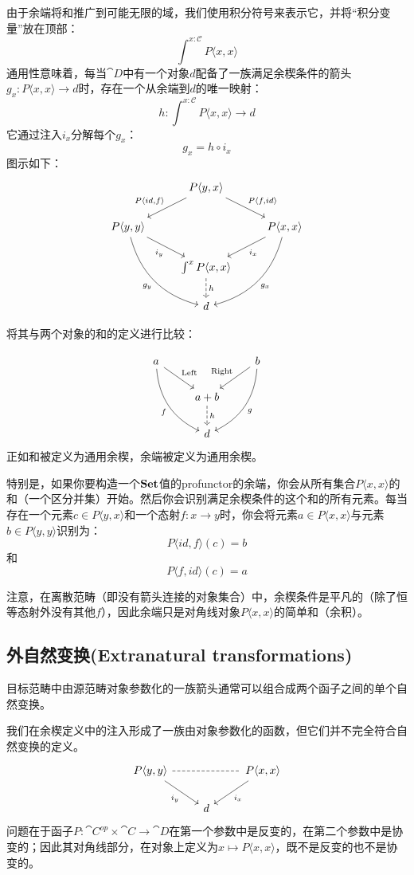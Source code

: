 \documentclass[DaoFP]{subfiles}
\begin{document}
由于余端将和推广到可能无限的域，我们使用积分符号来表示它，并将“积分变量”放在顶部：
\[ \int^{x\colon \mathcal{C}} P \langle x, x \rangle \]
通用性意味着，每当$\cat D$中有一个对象$d$配备了一族满足余楔条件的箭头$g_x \colon P \langle x, x \rangle \to d$时，存在一个从余端到$d$的唯一映射：
\[ h \colon \int^{x\colon \mathcal{C}} P \langle x, x \rangle \to d \]
它通过注入$i_x$分解每个$g_x$：
\[ g_x = h \circ i_x \]
图示如下：
\[
 \begin{tikzcd}
 &P \langle y, x \rangle
 \arrow[ld, "{P \langle id, f \rangle}"']
 \arrow[rd, "{P \langle f, id \rangle}"]
 \\
 P \langle y, y \rangle
 \arrow[dr, "i_y"']
 \arrow[ddr, bend right,  "g_y"']
 &&P \langle x, x \rangle
 \arrow[dl, "i_x"]
 \arrow[ddl, bend left,  "g_x"]
 \\
 &\int^x P \langle x, x \rangle
 \arrow[d, dashed, "h"]
 \\
 &d
 \end{tikzcd}
\]

将其与两个对象的和的定义进行比较：

\[
 \begin{tikzcd}
 a
 \arrow[dr, "\text{Left}"]
 \arrow[ddr, bend right, "f"']
 && b
 \arrow[dl, "\text{Right}"']
 \arrow[ddl, bend left, "g"]
 \\
&a + b
\arrow[d, dashed, "h"]
\\
& d
 \end{tikzcd}
\]
正如和被定义为通用余楔，余端被定义为通用余楔。

特别是，如果你要构造一个$\mathbf{Set}$值的profunctor的余端，你会从所有集合$P \langle x, x \rangle$的和（一个区分并集）开始。然后你会识别满足余楔条件的这个和的所有元素。每当存在一个元素$c  \in P \langle y, x \rangle$和一个态射$f \colon x \to y$时，你会将元素$a \in P \langle x, x \rangle$与元素$b \in P \langle y, y \rangle$识别为：
\[ P \langle id, f \rangle (c) = b\]
和
\[ P \langle f, id \rangle (c) = a\]

注意，在离散范畴（即没有箭头连接的对象集合）中，余楔条件是平凡的（除了恒等态射外没有其他$f$），因此余端只是对角线对象$P \langle x, x \rangle$的简单和（余积）。

\subsection{外自然变换(Extranatural transformations)}

目标范畴中由源范畴对象参数化的一族箭头通常可以组合成两个函子之间的单个自然变换。

我们在余楔定义中的注入形成了一族由对象参数化的函数，但它们并不完全符合自然变换的定义。
\[
 \begin{tikzcd}
 P \langle y, y \rangle
 \arrow[dr, "i_y"']
 \arrow[rr, dash, dashed]
 &&P \langle x, x \rangle
 \arrow[dl, "i_x"]
 \\
 &d
 \end{tikzcd}
\]
问题在于函子$P \colon \cat C^{op} \times \cat C \to \cat D$在第一个参数中是反变的，在第二个参数中是协变的；因此其对角线部分，在对象上定义为$x \mapsto P \langle x, x \rangle$，既不是反变的也不是协变的。
\end{document}
